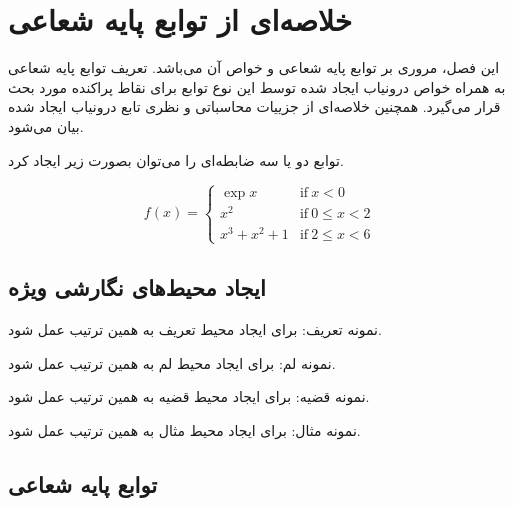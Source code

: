 \chapter{خلاصه‌ای از توابع پایه شعاعی} \label{se:rbf}

این فصل، مروری بر توابع پایه شعاعی و خواص آن می‌باشد. تعریف توابع پایه شعاعی به همراه خواص 
درونیاب ایجاد شده توسط این نوع توابع برای نقاط پراکنده مورد بحث قرار می‌گیرد. همچنین خلاصه‌ای از جزییات محاسباتی و نظری تابع درونیاب ایجاد شده بیا‌ن می‌شود.

توابع دو یا سه ضابطه‌ای را می‌توان بصورت زیر ایجاد کرد.

\begin{equation}
	f(x)=\left\{
	\begin{array}{ll}
		\exp{x} &\text{if}~ x<0 \\
		x^2 & \text{if}~0\leq x<2 \\
		x^3+x^2+1 &\text{if}~2\leq x<6
	\end{array}\right.
\end{equation}


\section{ایجاد محیط‌های نگارشی ویژه}

\begin{definition}
	نمونه تعریف: برای ایجاد محیط تعریف به همین ترتیب عمل شود.
\end{definition}

\begin{lem}
	نمونه لم: برای ایجاد محیط لم به همین ترتیب عمل شود.
\end{lem}

\begin{theo}
	نمونه قضیه: برای ایجاد محیط قضیه به همین ترتیب عمل شود.
\end{theo}

\begin{example}
	نمونه مثال: برای ایجاد محیط مثال به همین ترتیب عمل شود.
\end{example}

%
%
\section{توابع پایه شعاعی}

